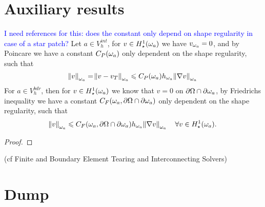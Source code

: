 \documentclass[thesis.tex]{subfiles}
\begin{document}
\section{Auxiliary results}
\textcolor{blue}{I need references for this: does the constant only depend on shape regularity in case of a star patch?}
\label{sec:aux}
Let $a \in V_h^{int}$, for $v \in H_\star^1(\omega_a)$ we have $v_{\omega_a} = 0$, and by Poincare we have a constant $C_P(\omega_a)$ only dependent
on the shape regularity, such that 
\[
  \norm{v}_{\omega_a} = \norm{v - v_T}_{\omega_a} \leqslant C_P(\omega_a) h_{\omega_a} \norm{\nabla v}_{\omega_a}
\]
For $a \in V_h^{bdr}$, then for $v \in H_\star^1(\omega_a)$ we know that $v = 0$ on $\partial \Omega \cap \partial \omega_a$, by Friedrichs inequality
 we
have a constant $C_F(\omega_a, \partial \Omega \cap \partial \omega_a)$ only dependent on the shape regularity, such that
\[
  \norm{v}_{\omega_a} \leqslant C_F(\omega_a, \partial \Omega \cap \partial \omega_a) h_{\omega_a} \norm{\nabla v}_{\omega_a} \quad \forall v \in H_\star^1(\omega_a).
\]

\begin{proof}
\end{proof}
(cf Finite and Boundary Element Tearing and Interconnecting Solvers)

\iffalse
\section{Dump}
\end{document}

